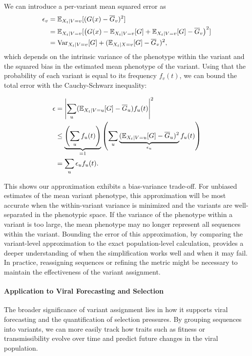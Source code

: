We can introduce a per-variant mean squared error as 
\begin{align}
  \epsilon_v &= \mathbb{E}_{X_{t} \mid V=v}[(G(x) - \overline{G}_v)^2]\\
           &= \mathbb{E}_{X_{t} \mid V=v}[\left(G(x) - \mathbb{E}_{X_{t} \mid V=v}[G] + \mathbb{E}_{X_{t} \mid V=v}[G] - \overline{G}_v\right)^2 ]\\
           &= \text{Var}_{X_{t} \mid V=v}[G] + (\mathbb{E}_{X_t \mid X=v}[G] - \overline{G}_v)^2,
\end{align}
which depends on the intrinsic variance of the phenotype within the variant and the squared bias in the estimated mean phenotype of the variant.
Using that the probability of each variant is equal to its frequency $f_v(t)$, we can bound the total error with the Cauchy-Schwarz inequality:

\begin{align}
  \epsilon  &= \left| \sum_{u} (\mathbb{E}_{X_{t} \mid V=u}[G] - \overline{G}_u) f_u(t)  \right|^2\\
            &\leq \underbrace{\left(\sum_{u} f_u(t) \right)}_{=1} \left(\sum_{u}  \underbrace{(\mathbb{E}_{X_{t} \mid V=u}[G] - \overline{G}_u)^2}_{\epsilon_u} f_u(t)\right)\\
          &= \sum_{u} \epsilon_u f_u(t).
\end{align}

This shows our approximation exhibits a bias-variance trade-off.
For unbiased estimates of the mean variant phenotype, this approximation will be most accurate when the within-variant variance is minimized and the variants are well-separated in the phenotypic space.
If the variance of the phenotype within a variant is too large, the mean phenotype may no longer represent all sequences within the variant.
Bounding the error of this approximation, by comparing the variant-level approximation to the exact population-level calculation, provides a deeper understanding of when the simplification works well and when it may fail.
In practice, reassigning sequences or refining the metric might be necessary to maintain the effectiveness of the variant assignment.

\paragraph{Application to Viral Forecasting and Selection}

The broader significance of variant assignment lies in how it supports viral forecasting and the quantification of selection pressures.
By grouping sequences into variants, we can more easily track how traits such as fitness or transmissibility evolve over time and predict future changes in the viral population.

